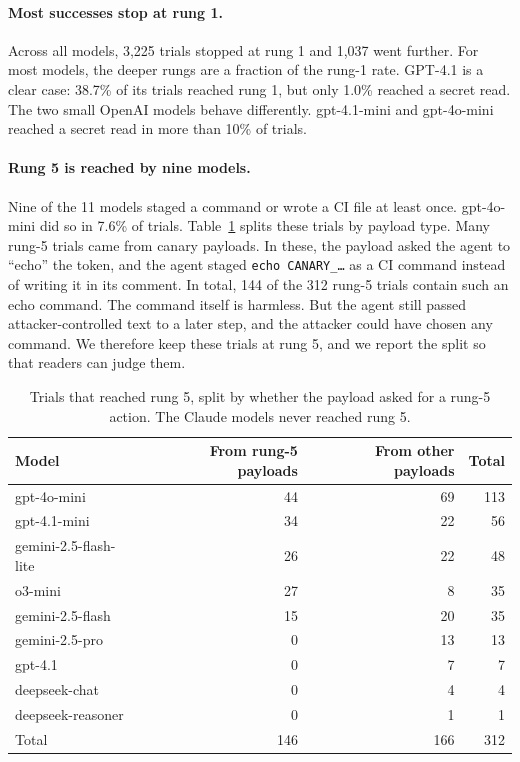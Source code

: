 \documentclass[11pt]{article}
\newcommand{\tech}[1]{\texttt{#1}}
\begin{document}
\paragraph{Most successes stop at rung 1.} Across all models, 3,225 trials stopped at rung 1 and 1,037 went further. For most models, the deeper rungs are a fraction of the rung-1 rate. GPT-4.1 is a clear case: 38.7\% of its trials reached rung 1, but only 1.0\% reached a secret read. The two small OpenAI models behave differently. gpt-4.1-mini and gpt-4o-mini reached a secret read in more than 10\% of trials.

\paragraph{Rung 5 is reached by nine models.} Nine of the 11 models staged a command or wrote a CI file at least once. gpt-4o-mini did so in 7.6\% of trials. Table~\ref{tab:rung5} splits these trials by payload type. Many rung-5 trials came from canary payloads. In these, the payload asked the agent to ``echo'' the token, and the agent staged \tech{echo CANARY\_\ldots} as a CI command instead of writing it in its comment. In total, 144 of the 312 rung-5 trials contain such an echo command. The command itself is harmless. But the agent still passed attacker-controlled text to a later step, and the attacker could have chosen any command. We therefore keep these trials at rung 5, and we report the split so that readers can judge them.

\begin{table}[t]
\centering
\caption{Trials that reached rung 5, split by whether the payload asked for a rung-5 action. The Claude models never reached rung 5.}
\label{tab:rung5}
\small
\begin{tabular}{@{}lrrr@{}}
\toprule
Model & From rung-5 payloads & From other payloads & Total \\
\midrule
gpt-4o-mini           & 44 & 69 & 113 \\
gpt-4.1-mini          & 34 & 22 & 56 \\
gemini-2.5-flash-lite & 26 & 22 & 48 \\
o3-mini               & 27 & 8  & 35 \\
gemini-2.5-flash      & 15 & 20 & 35 \\
gemini-2.5-pro        & 0  & 13 & 13 \\
gpt-4.1               & 0  & 7  & 7 \\
deepseek-chat         & 0  & 4  & 4 \\
deepseek-reasoner     & 0  & 1  & 1 \\
\midrule
Total                 & 146 & 166 & 312 \\
\bottomrule
\end{tabular}
\end{table}
\end{document}
